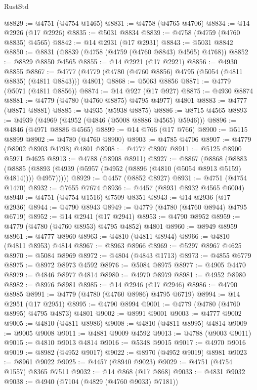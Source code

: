 \begin{lexlean}{RustStd}
\begin{coremodule}
@8829 := @4751 (@4754 @1465)
@8831 := @4758 (@4765 @4706)
@8834 := @14 @2926 (@17 @2926)
@8835 := @5031 @8834
@8839 := @4758 (@4759 (@4760 @8835) @4565)
@8842 := @14 @2931 (@17 @2931)
@8843 := @5031 @8842
@8850 := @8831 (@8839 (@4758 (@4759 (@4760 @8843) @4565) @4768))
@8852 := @8829 @8850 @4565
@8855 := @14 @2921 (@17 @2921)
@8856 := @4930 @8855
@8867 := @4777 (@4779 (@4780 (@4760 @8856) @4795 (@5054 (@4811 @8835) (@4811 @8843))) @4801)
@8868 := @5063 @8856
@8871 := @4779 (@5071 (@4811 @8856))
@8874 := @14 @927 (@17 @927)
@8875 := @4930 @8874
@8881 := @4779 (@4780 (@4760 @8875) @4795 @4977) @4801
@8883 := @4777 (@8871 @8881)
@8885 := @4935 (@5938 @8875)
@8886 := @8715 @4565
@8893 := @4939 (@4969 (@4952 (@4846 (@5008 @8886 @4565) @5946)))
@8896 := @4846 (@4971 @8886 @4565)
@8899 := @14 @766 (@17 @766)
@8900 := @5115 @8899
@8902 := @4780 (@4760 @8900)
@8903 := @4785 @4706
@8907 := @4779 (@8902 @8903 @4798) @4801
@8908 := @4777 @8907
@8911 := @5125 @8900 @5971 @4625
@8913 := @4788 (@8908 @8911)
@8927 := @8867
    (@8868
      (@8883
        (@8885 (@8893 (@4939 (@5957 (@4952 (@8896 (@4810 (@5054 @8913 @5159) @4814)))) @4957)))))
@8929 := @4457 (@8852 @8927)
@8931 := @4751 (@4754 @1470)
@8932 := @7655 @7674
@8936 := @4457 (@8931 @8932 @4565 @6004)
@8940 := @4751 (@4754 @1516) @7509 @8351
@8943 := @14 @2936 (@17 @2936)
@8944 := @4790 @8943
@8949 := @4779 (@4780 (@4760 @8944) @4795 @6719)
@8952 := @14 @2941 (@17 @2941)
@8953 := @4790 @8952
@8959 := @4779 (@4780 (@4760 @8953) @4795 @4852) @4801
@8960 := @8949 @8959
@8961 := @4777 @8960
@8963 := @4810 (@4811 @8944)
@8966 := @4810 (@4811 @8953) @4814
@8967 := @8963 @8966
@8969 := @5297 @8967 @4625
@8970 := @5084 @8969
@8972 := @4804 (@4843 @1713)
@8973 := @4855 @6779
@8975 := @8972 @8973 @4592
@8976 := @5084 @8975
@8977 := @4905 @4470
@8979 := @4846 @8977 @4814
@8980 := @4970 @8979
@8981 := @4952 @8980
@8982 := @8976 @8981
@8985 := @14 @2946 (@17 @2946)
@8986 := @4790 @8985
@8991 := @4779 (@4780 (@4760 @8986) @4795 @6719)
@8994 := @14 @2951 (@17 @2951)
@8995 := @4790 @8994
@9001 := @4779 (@4780 (@4760 @8995) @4795 @4873) @4801
@9002 := @8991 @9001
@9003 := @4777 @9002
@9005 := @4810 (@4811 @8986)
@9008 := @4810 (@4811 @8995) @4814
@9009 := @9005 @9008
@9011 := @4881 @9009 @4592
@9013 := @4788 (@9003 @9011)
@9015 := @4810 @9013 @4814
@9016 := @5348 @9015
@9017 := @4970 @9016
@9019 := @8982 (@4952 @9017)
@9022 := @8970 (@4952 @9019) @8981
@9023 := @8961 @9022
@9025 := @4457 (@8940 @9023)
@9029 := @4751 (@4754 @1557) @8365 @7511
@9032 := @14 @868 (@17 @868)
@9033 := @4831 @9032
@9038 := @4940 (@7104 (@4829 (@4760 @9033) @7181))

\end{coremodule}
\end{lexlean}
